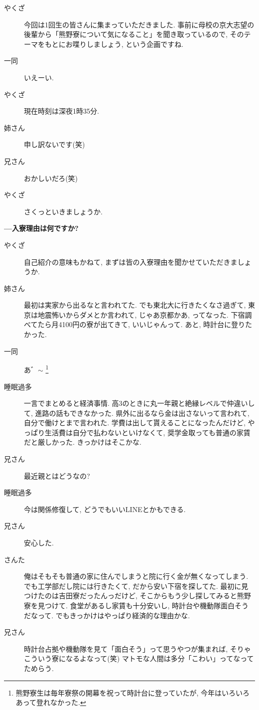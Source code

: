 \documentclass[10pt,b5jsbook,dvips,dvipdfmx,openany]{jsbook}
\theoremstyle{definition}
\begin{document}
		\begin{multicols}{2}
		\begin{description}
		\item[やくざ] 今回は1回生の皆さんに集まっていただきました. 事前に母校の京大志望の後輩から「熊野寮について気になること」を聞き取っているので, そのテーマをもとにお喋りしましょう, という企画ですね.
		\item[ 一同 ] いえーい.
		\item[やくざ] 現在時刻は深夜1時35分.
		\item[姉さん] 申し訳ないです(笑)
		\item[兄さん] おかしいだろ(笑)
		\item[やくざ] さくっといきましょうか.
		\end{description}

		\textbf{---入寮理由は何ですか? }
		\begin{description}
		\item[やくざ]自己紹介の意味もかねて, まずは皆の入寮理由を聞かせていただきましょうか.
		\item[姉さん]最初は実家から出るなと言われてた. でも東北大に行きたくなさ過ぎて, 東京は地震怖いからダメとか言われて, じゃあ京都かあ, ってなった. 下宿調べてたら月4100円の寮が出てきて, いいじゃんって. あと, 時計台に登りたかった.
		\item[ 一同 ]あ゛$\sim$ \footnote{熊野寮生は毎年寮祭の開幕を祝って時計台に登っていたが, 今年はいろいろあって登れなかった. }
		\item[睡眠過多]一言でまとめると経済事情. 高3のときに丸一年親と絶縁レベルで仲違いして, 進路の話もできなかった. 県外に出るなら金は出さないって言われて, 自分で働けとまで言われた. 学費は出して貰えることになったんだけど, やっぱり生活費は自分で払わないといけなくて, 奨学金取っても普通の家賃だと厳しかった. きっかけはそこかな.
		\item[兄さん]最近親とはどうなの?
		\item[睡眠過多]今は関係修復して, どうでもいいLINEとかもできる.
		\item[兄さん]安心した.
		\item[さんた]俺はそもそも普通の家に住んでしまうと院に行く金が無くなってしまう. でも工学部だし院には行きたくて, だから安い下宿を探してた. 最初に見つけたのは吉田寮だったんっだけど, そこからもう少し探してみると熊野寮を見つけて. 食堂があるし家賃も十分安いし, 時計台や機動隊面白そうだなって. でもきっかけはやっぱり経済的な理由かな.
		\item[兄さん]時計台占拠や機動隊を見て「面白そう」って思うやつが集まれば, そりゃこういう寮になるよなって(笑) マトモな人間は多分「こわい」ってなってためらう.

\end{description}
\end{multicols}
\end{document}
